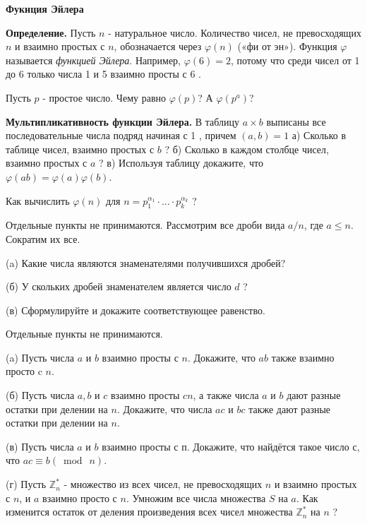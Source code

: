 \centerline{\bf \Huge Фукнция Эйлера}

\textbf{Определение.} Пусть $n$ - натуральное число. Количество чисел, не превосходящих $n$ и взаимно простых с $n$, обозначается через $\varphi(n)$ («фи от эн»). Функция $\varphi$ называется \textit{функцией Эйлера}. Например, $\varphi(6)=2$, потому что среди чисел от 1 до 6 только числа 1 и 5 взаимно просты с 6 .

Пусть $p$ - простое число. Чему равно $\varphi(p)$? А $\varphi\left(p^a\right)$?

\textbf{Мультипликативность функции Эйлера.}
В таблицу $a \times b$ выписаны все последовательные числа подряд начиная с 1 , причем $(a, b)=1$
а) Сколько в таблице чисел, взаимно простых с $b$ ?
б) Сколько в каждом столбце чисел, взаимно простых с $a$ ?
в) Используя таблицу докажите, что $\varphi(a b)=\varphi(a) \varphi(b)$.

Как вычислить $\varphi(n)$ для $n=p_1^{\alpha_1} \cdot \ldots \cdot p_k^{\alpha_k}$ ?


Отдельные пункты не принимаются. Рассмотрим все дроби вида $a / n$, где $a \leqslant n$. Сократим их все.

(a) Какие числа являются знаменателями получившихся дробей?

(б) У скольких дробей знаменателем является число $d$ ?

(в) Сформулируйте и докажите соответствующее равенство.

Отдельные пункты не принимаются.

(a) Пусть числа $a$ и $b$ взаимно просты с $n$. Докажите, что $a b$ также взаимно просто c $n$.

(б) Пусть числа $a, b$ и $c$ взаимно просты $c n$, а также числа $a$ и $b$ дают разные остатки при делении на $n$. Докажите, что числа $a c$ и $b c$ также дают разные остатки при делении на $n$.

(в) Пусть числа $a$ и $b$ взаимно просты с п. Докажите, что найдётся такое число с, что $a c \equiv b(\bmod\ n)$.

(г) Пусть $\mathbb{Z}_n^*$ - множество из всех чисел, не превосходящих $n$ и взаимно простых с $n$, и $a$ взаимно просто с $n$. Умножим все числа множества $S$ на $a$. Как изменится остаток от деления произведения всех чисел множества $\mathbb{Z}_n^*$ на $n$ ?

\newpage

\hspace{3mm}


